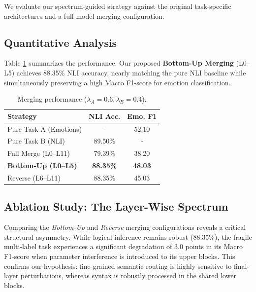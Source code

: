 \documentclass{article}
\begin{document}
We evaluate our spectrum-guided strategy against the original task-specific architectures and a full-model merging configuration.

\subsection{Quantitative Analysis}

Table \ref{tab:results} summarizes the performance. Our proposed \textbf{Bottom-Up Merging} (L0--L5) achieves 88.35\% NLI accuracy, nearly matching the pure NLI baseline while simultaneously preserving a high Macro F1-score for emotion classification.

\begin{table}[h]
\vspace{-2mm}
\caption{Merging performance ($\lambda_A = 0.6, \lambda_B = 0.4$).}
\label{tab:results}
\begin{center}
\begin{small}
\begin{tabular}{l | c c}
\toprule
\textbf{Strategy} & \textbf{NLI Acc.} & \textbf{Emo. F1} \\
\midrule
Pure Task A (Emotions) & - & 52.10 \\
Pure Task B (NLI)      & 89.50\% & - \\
\midrule
Full Merge (L0--L11)   & 79.39\% & 38.20 \\
\textbf{Bottom-Up (L0--L5)} & \textbf{88.35\%} & \textbf{48.03} \\
Reverse (L6--L11)      & 88.35\% & 45.03 \\
\bottomrule
\end{tabular}
\end{small}
\end{center}
\vspace{-2mm}
\end{table}

\subsection{Ablation Study: The Layer-Wise Spectrum}

Comparing the \emph{Bottom-Up} and \emph{Reverse} merging configurations reveals a critical structural asymmetry. While logical inference remains robust (88.35\%), the fragile multi-label task experiences a significant degradation of 3.0 points in its Macro F1-score when parameter interference is introduced to its upper blocks. This confirms our hypothesis: fine-grained semantic routing is highly sensitive to final-layer perturbations, whereas syntax is robustly processed in the shared lower blocks.
\end{document}
